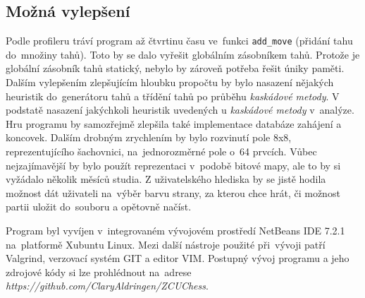 \documentclass[11pt, titlepage]{article}
\begin{document}
\subsection{Možná vylepšení}
Podle profileru tráví program až čtvrtinu času ve~funkci {\tt add\_move} (přidání tahu do~množiny tahů). Toto by se dalo vyřešit globálním zásobníkem tahů. Protože je globální zásobník tahů statický, nebylo by zároveň potřeba řešit úniky paměti.
Dalším vylepšením zlepšujícím hloubku propočtu by bylo nasazení nějakých heuristik do~generátoru tahů a třídění tahů po průběhu {\it kaskádové metody}. V podstatě nasazení jakýchkoli heuristik uvedených u {\it kaskádové metody} v~analýze.
Hru programu by samozřejmě zlepšila také implementace databáze zahájení a koncovek.
Dalším drobným zrychlením by bylo rozvinutí pole 8x8, reprezentujícího šachovnici, na~jednorozměrné pole o~64 prvcích. Vůbec nejzajímavější by bylo použít reprezentaci v~podobě bitové mapy, ale to by si vyžádalo několik měsíců studia.
Z uživatelského hlediska by se jistě hodila možnost dát uživateli na~výběr barvu strany, za kterou chce hrát, či možnost partii uložit do~souboru a opětovně načíst.

Program byl vyvíjen v~integrovaném vývojovém prostředí NetBeans IDE 7.2.1 na~platformě Xubuntu Linux. Mezi další nástroje použité při~vývoji patří Valgrind, verzovací systém GIT a editor VIM.
Postupný vývoj programu a jeho zdrojové kódy si lze prohlédnout na~adrese {\it https://github.com/ClaryAldringen/ZCUChess}.
\end{document}
